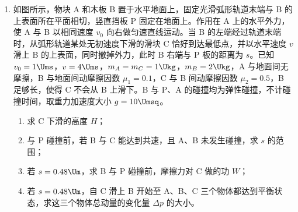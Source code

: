 \documentclass[\gkver]{gaokaozhenti}
\begin{document}
\begin{enumerate}
{联立以上各式解得 $v_{1}=15\sqrt{\frac{qEd}{m}}$，$v_{0}=9\sqrt{\frac{qEd}{m}}$

$E' = 36E$

（ii）粒子从 P 到 Q 根据动能定理有

$qE' \cdot 2d = \frac{1}{2}mv_{2}^{2} - \frac{1}{2}mv_{1}^{2}$

可得从 Q 射出时的速度为

$v_{2}=3\sqrt{41}\frac{qEd}{m}$

此时粒子在磁场中的半径

$R_{2}=\frac{mv_{2}}{qB}=\frac{\sqrt{41}}{2}d$

根据其几何关系可知对应的圆心坐标为 $x = \frac{5}{2}d$，$y = 4d$

而圆心与 P 的距离为

$l=\sqrt{\left(\frac{5}{2}d-2d\right)^{2}+\left(4d-0\right)^{2}}=\frac{\sqrt{65}}{2}d\neq R_{2}$

故不会再从 P 点进入电场。
}

\item
如图所示，物块 A 和木板 B 置于水平地面上，固定光滑弧形轨道末端与 B 的上表面所在平面相切，竖直挡板 P 固定在地面上。作用在 A 上的水平外力，使 A 与 B 以相同速度 $v_{0}$ 向右做匀速直线运动。当 B 的左端经过轨道末端时，从弧形轨道某处无初速度下滑的滑块 C 恰好到达最低点，并以水平速度 $v$ 滑上 B 的上表面，同时撤掉外力，此时 B 右端与 P 板的距离为 $s$。已知 $v_{0} = 1 \Ums$，$v = 4 \Ums$，$m_{A} = m_{C} = 1 \Ukg$，$m_{B} = 2 \Ukg$，A 与地面间无摩擦，B 与地面间动摩擦因数 $\mu_{1} = 0.1$，C 与 B 间动摩擦因数 $\mu_{2} = 0.5$，B 足够长，使得 C 不会从 B 上滑下。B 与 P、A 的碰撞均为弹性碰撞，不计碰撞时间，取重力加速度大小 $g = 10 \Umsq$。
\begin{enumerate}
	\item
	求 C 下滑的高度 $H$；
	\item
	与 P 碰撞前，若 B 与 C 能达到共速，且 A、B 未发生碰撞，求 $s$ 的范围；
	\item
	若 $s = 0.48 \Um$，求 B 与 P 碰撞前，摩擦力对 C 做的功 $W$；
	\item
	若 $s = 0.48 \Um$，自 C 滑上 B 开始至 A、B、C 三个物体都达到平衡状态，求这三个物体总动量的变化量 $\Delta p$ 的大小。
\end{enumerate}


\end{enumerate}
\end{document}
